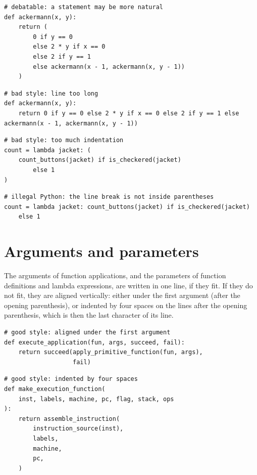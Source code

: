 \begin{lstlisting}
# debatable: a statement may be more natural
def ackermann(x, y):
    return (
        0 if y == 0
        else 2 * y if x == 0
        else 2 if y == 1
        else ackermann(x - 1, ackermann(x, y - 1))
    )
\end{lstlisting}

\begin{lstlisting}
# bad style: line too long
def ackermann(x, y):
    return 0 if y == 0 else 2 * y if x == 0 else 2 if y == 1 else ackermann(x - 1, ackermann(x, y - 1))
\end{lstlisting}

\begin{lstlisting}
# bad style: too much indentation
count = lambda jacket: (
    count_buttons(jacket) if is_checkered(jacket)
        else 1
)
\end{lstlisting}

\begin{lstlisting}
# illegal Python: the line break is not inside parentheses
count = lambda jacket: count_buttons(jacket) if is_checkered(jacket)
    else 1
\end{lstlisting}

\section*{Arguments and parameters}

The arguments of function applications, and the parameters of function definitions and lambda
expressions, are written in one line, if they fit. If they do not fit, they are aligned vertically:
either under the first argument (after the opening parenthesis), or indented by four spaces on the
lines after the opening parenthesis, which is then the last character of its line.

\begin{lstlisting}
# good style: aligned under the first argument
def execute_application(fun, args, succeed, fail):
    return succeed(apply_primitive_function(fun, args),
                   fail)
\end{lstlisting}

\begin{lstlisting}
# good style: indented by four spaces
def make_execution_function(
    inst, labels, machine, pc, flag, stack, ops
):
    return assemble_instruction(
        instruction_source(inst),
        labels,
        machine,
        pc,
    )
\end{lstlisting}

